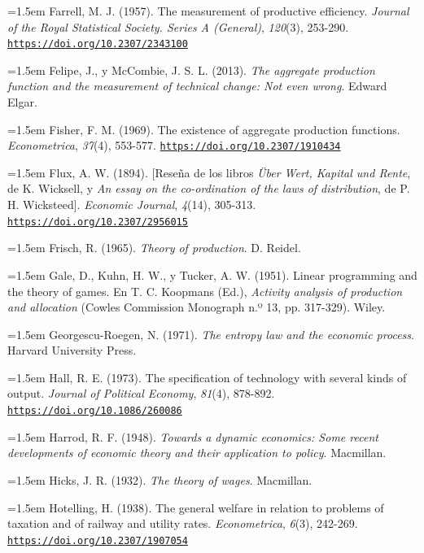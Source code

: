 \documentclass[10pt,a4paper]{article}
\begin{document}
\noindent\hangindent=1.5em Farrell, M. J. (1957). The measurement of productive efficiency. \textit{Journal of the Royal Statistical Society. Series A (General)}, \textit{120}(3), 253-290. \href{https://doi.org/10.2307/2343100}{\nolinkurl{https://doi.org/10.2307/2343100}}

\noindent\hangindent=1.5em Felipe, J., y McCombie, J. S. L. (2013). \textit{The aggregate production function and the measurement of technical change: \textup{Not even wrong}}. Edward Elgar.

\noindent\hangindent=1.5em Fisher, F. M. (1969). The existence of aggregate production functions. \textit{Econometrica}, \textit{37}(4), 553-577. \href{https://doi.org/10.2307/1910434}{\nolinkurl{https://doi.org/10.2307/1910434}}

\noindent\hangindent=1.5em Flux, A. W. (1894). [Reseña de los libros \textit{Über Wert, Kapital und Rente}, de K. Wicksell, y \textit{An essay on the co-ordination of the laws of distribution}, de P. H. Wicksteed]. \textit{Economic Journal}, \textit{4}(14), 305-313. \href{https://doi.org/10.2307/2956015}{\nolinkurl{https://doi.org/10.2307/2956015}}

\noindent\hangindent=1.5em Frisch, R. (1965). \textit{Theory of production}. D. Reidel.

\noindent\hangindent=1.5em Gale, D., Kuhn, H. W., y Tucker, A. W. (1951). Linear programming and the theory of games. En T. C. Koopmans (Ed.), \textit{Activity analysis of production and allocation} (Cowles Commission Monograph n.º 13, pp. 317-329). Wiley.

\noindent\hangindent=1.5em Georgescu-Roegen, N. (1971). \textit{The entropy law and the economic process}. Harvard University Press.

\noindent\hangindent=1.5em Hall, R. E. (1973). The specification of technology with several kinds of output. \textit{Journal of Political Economy}, \textit{81}(4), 878-892. \href{https://doi.org/10.1086/260086}{\nolinkurl{https://doi.org/10.1086/260086}}

\noindent\hangindent=1.5em Harrod, R. F. (1948). \textit{Towards a dynamic economics: Some recent developments of economic theory and their application to policy}. Macmillan.

\noindent\hangindent=1.5em Hicks, J. R. (1932). \textit{The theory of wages}. Macmillan.

\noindent\hangindent=1.5em Hotelling, H. (1938). The general welfare in relation to problems of taxation and of railway and utility rates. \textit{Econometrica}, \textit{6}(3), 242-269. \href{https://doi.org/10.2307/1907054}{\nolinkurl{https://doi.org/10.2307/1907054}}
\end{document}
